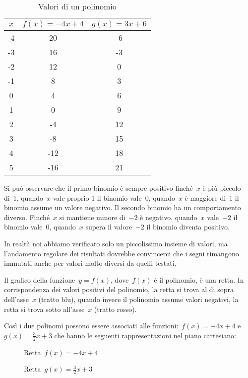 \begin{table}[h!]
\label{tab:valoripolinomio}
\caption{Valori di un polinomio}
\center
\label{tab:valori}
 \begin{tabular}{c|c|c}
  $x$ & $f(x) = -4 x +4$ & $g(x) = 3 x +6$ \\
  \hline
  -4 &  20 & -6 \\
  -3 &  16 & -3 \\
  -2 &  12 &  0 \\
  -1 &   8 &  3 \\
   0 &   4 &  6 \\
   1 &   0 &  9 \\
   2 &  -4 & 12 \\
   3 &  -8 & 15 \\
   4 & -12 & 18 \\
   5 & -16 & 21
 \end{tabular}
\end{table}

Si può osservare che il primo binomio è sempre positivo finché~$x$ è più 
piccolo di~1, quando~$x$ vale proprio 1 il binomio vale~0, quando~$x$ è 
maggiore di~1 il binomio assume un valore negativo.
Il secondo binomio ha un comportamento diverso. Finché~$x$ si mantiene 
minore di~$-2$ è negativo, quando~$x$ vale~$-2$ il binomio vale~0, quando~$x$ 
supera il valore~$-2$ il binomio diventa positivo.

In realtà noi abbiamo verificato solo un piccolissimo insieme di valori, 
ma l'andamento regolare dei risultati dovrebbe convincerci che i segni 
rimangono immutati anche per valori molto diversi da quelli testati.

Il grafico della funzione~$y=f(x)$, dove~$f(x)$ è il polinomio, è una retta. 
In corrispondenza dei valori positivi del polinomio, la retta si trova al di 
sopra dell'asse~$x$ (tratto blu), quando invece il polinomio assume valori 
negativi, la retta si trova sotto all'asse~$x$ (tratto rosso).

Così i due polinomi possono essere associati alle 
funzioni:~$f(x) = -4 x +4$ e~$g(x) = \frac{3}{2} x +3$ che hanno le seguenti 
rappresentazioni nel piano cartesiano:

\begin{inaccessibleblock}
 \begin{figure}[h]
 \centering
 \begin{minipage}[]{.45\textwidth}
  \centering
  \caption{Retta~$f(x) = -4 x +4$}
 \end{minipage}
 \begin{minipage}[]{.45\textwidth}
  \centering
  \caption{Retta~$g(x) = \frac{3}{2} x +3$}
 \end{minipage}
\end{figure}
\end{inaccessibleblock}


